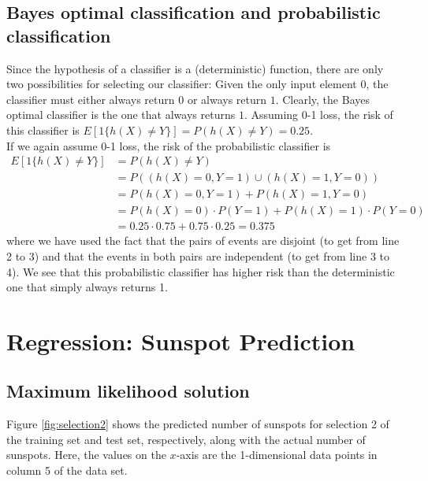 \documentclass[a4paper]{article}
\begin{document}
\subsection{Bayes optimal classification and probabilistic classification}
Since the hypothesis of a classifier is a (deterministic) function, there are only two possibilities for selecting our classifier: Given the only input element $0$, the classifier must either always return $0$ or always return $1$. Clearly, the Bayes optimal classifier is the one that always returns $1$. Assuming 0-1 loss, the risk of this classifier is $E[1 \{ h(X) \neq Y \}] = P(h(X) \neq Y) = 0.25$.\\

If we again assume 0-1 loss, the risk of the probabilistic classifier is
\begin{align*}
E[1 \{ h(X) \neq Y \}] &= P(h(X) \neq Y) \\
&= P((h(X) = 0, Y = 1) \cup (h(X) = 1, Y = 0)) \\
&= P(h(X) = 0, Y = 1) + P(h(X) = 1, Y = 0) \\
&= P(h(X) = 0) \cdot P(Y = 1) + P(h(X) = 1) \cdot P(Y = 0) \\
&= 0.25 \cdot 0.75 + 0.75 \cdot 0.25 = 0.375
\end{align*}
where we have used the fact that the pairs of events are disjoint (to get from line 2 to 3) and that the events in both pairs are independent (to get from line 3 to 4). We see that this probabilistic classifier has higher risk than the deterministic one that simply always returns 1.

\section{Regression: Sunspot Prediction}

\subsection{Maximum likelihood solution}
Figure \ref{fig:selection2} shows the predicted number of sunspots for selection 2 of the training set and test set, respectively, along with the actual number of sunspots. Here, the values on the $x$-axis are the 1-dimensional data points in column 5 of the data set.
\end{document}
